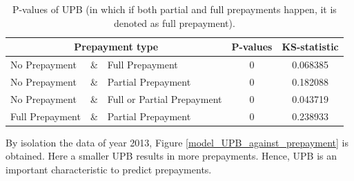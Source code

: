         \begin{table}[H]
        \centering
            \begin{tabular}{lcl|c|c}
            \multicolumn{3}{c|}{Prepayment type} & P-values& KS-statistic \\\hline
            No Prepayment & \& & Full Prepayment & 0 & 0.068385\\
            No Prepayment & \& & Partial Prepayment & 0 & 0.182088\\
            No Prepayment & \& & Full or Partial Prepayment & 0 & 0.043719 \\
            Full Prepayment & \& & Partial Prepayment & 0 & 0.238933
		    \end{tabular}
            \caption{P-values of UPB (in which if both partial and full prepayments happen, it is denoted as full prepayment).}
	        \label{model_Pvals_of_UPB}
        \end{table}
        \noindent
        By isolation the data of year 2013, Figure  \ref{model_UPB_against_prepayment} is obtained. Here a smaller UPB results in more prepayments. Hence, UPB is an important characteristic to predict prepayments. 
